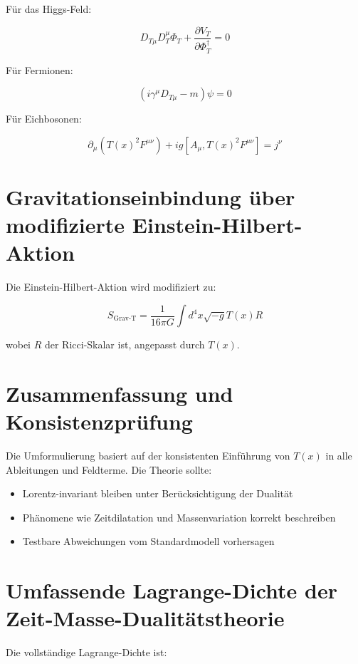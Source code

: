\documentclass{article}
\begin{document}
	Für das Higgs-Feld:
	
	\begin{equation}
		D_{T\mu} D_T^\mu \Phi_T + \frac{\partial V_T}{\partial \Phi_T^\dagger} = 0
	\end{equation}
	
	Für Fermionen:
	
	\begin{equation}
		(i \gamma^\mu D_{T\mu} - m) \psi = 0
	\end{equation}
	
	Für Eichbosonen:
	
	\begin{equation}
		\partial_\mu (T(x)^2 F^{\mu\nu}) + i g [A_\mu, T(x)^2 F^{\mu\nu}] = j^\nu
	\end{equation}
	
	\section{Gravitationseinbindung über modifizierte Einstein-Hilbert-Aktion}
	Die Einstein-Hilbert-Aktion wird modifiziert zu:
	
	\begin{equation}
		S_{\text{Grav-T}} = \frac{1}{16\pi G} \int d^4x \sqrt{-g} T(x) R
	\end{equation}
	
	wobei \( R \) der Ricci-Skalar ist, angepasst durch \( T(x) \).
	
	\section{Zusammenfassung und Konsistenzprüfung}
	Die Umformulierung basiert auf der konsistenten Einführung von \( T(x) \) in alle Ableitungen und Feldterme. Die Theorie sollte:
	
	\begin{itemize}
		\item Lorentz-invariant bleiben unter Berücksichtigung der Dualität
		\item Phänomene wie Zeitdilatation und Massenvariation korrekt beschreiben
		\item Testbare Abweichungen vom Standardmodell vorhersagen
	\end{itemize}
	
	\section{Umfassende Lagrange-Dichte der Zeit-Masse-Dualitätstheorie}
	Die vollständige Lagrange-Dichte ist:
	
\end{document}
